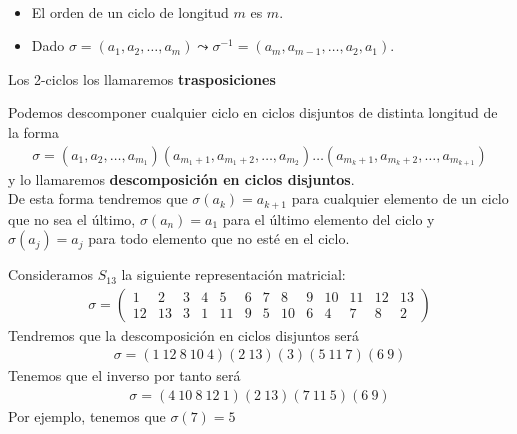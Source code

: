  \begin{lema}\
    \begin{itemize}
        \item El orden de un ciclo de longitud $m$ es $m$.
        \item Dado $\sigma=(a_1,a_2,\dots,a_m) \leadsto \sigma^{-1}=(a_m, a_{m-1},\dots,a_2, a_1)$.
    \end{itemize} 
 \end{lema}

 \begin{definicion}
    Los 2-ciclos los llamaremos \textbf{trasposiciones}
 \end{definicion}

 \begin{definicion}
     Podemos descomponer cualquier ciclo en ciclos disjuntos de distinta longitud de la forma
     \begin{align*}
        \sigma = (a_1,a_2,\dots,a_{m_1})(a_{m_1+1}, a_{m_1+2}, \dots, a_{m_2})\dots(a_{m_k+1}, a_{m_k+2},\dots,a_{m_{k+1}})
     \end{align*}
     y lo llamaremos \textbf{descomposición en ciclos disjuntos}.\\

     De esta forma tendremos que $\sigma(a_k)=a_{k+1}$ para cualquier elemento de un ciclo que no sea el último, $\sigma(a_n)=a_{1}$ para el último elemento del ciclo y $\sigma(a_j)=a_j$ para todo elemento que no esté en el ciclo.
 \end{definicion}

 \begin{ejemplo}
    Consideramos $S_{13}$ la siguiente representación matricial:
    \begin{align*}
        \sigma = \left(
        \begin{array}{ccccccccccccc}
            1 & 2 & 3 & 4 & 5 & 6 & 7 & 8 & 9 & 10 & 11 & 12 & 13\\
            12 & 13 & 3 & 1 & 11 & 9 & 5 & 10 & 6 & 4 & 7 & 8 & 2
        \end{array}
        \right)
    \end{align*}
    Tendremos que la descomposición en ciclos disjuntos será
    \begin{align*}
        \sigma = (1\ 12\ 8\ 10\ 4)(2\ 13)(3)(5\ 11\ 7)(6\ 9)
    \end{align*}
    Tenemos que el inverso por tanto será
    \begin{align*}
        \sigma = (4\ 10\ 8\ 12\ 1)(2\ 13)(7\ 11\ 5)(6\ 9)
    \end{align*}
    Por ejemplo, tenemos que $\sigma(7)=5$
 \end{ejemplo}

